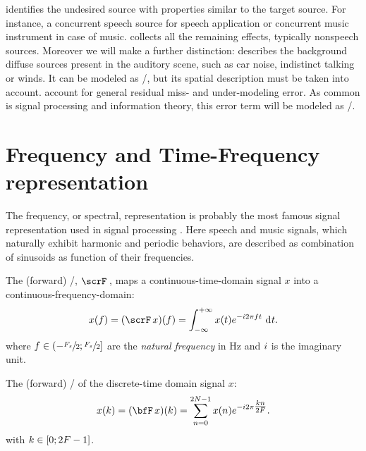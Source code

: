  identifies the undesired source with properties similar to the target source.
For instance, a concurrent speech source for speech application or concurrent music instrument in case of music.
 collects all the remaining effects, typically nonspeech sources. Moreover we will make a further distinction:
 describes the background diffuse sources present in the auditory scene, such as car noise, indistinct talking or winds.
It can be modeled as \AWGNdef/, but its spatial description must be taken into account.
 account for general residual miss- and under-modeling error.
As common is signal processing and information theory, this error term will be modeled as \AWGN/.

\section{Frequency and Time-Frequency representation}\label{sec:processing:domains}
The frequency, or spectral, representation is probably the most famous signal representation used in signal processing
.
Here speech and music signals, which naturally exhibit harmonic and periodic behaviors,
are described as combination of sinusoids as function of their frequencies.

The (forward) \FTdef/, $\fourierTrans{}$, maps a continuous-time-domain signal $x$ into a continuous-frequency-domain:
\begin{equation}
    x(f) = (\fourierTrans{x})(f) =
        \int_{-\infty}^{+\infty}
        x(t)
        \cste^{-\csti 2 \pi f t}
        \,\kdiff{t}.
\end{equation}
where $f \in \kintervoc{-\sfrac{\Fs}{2}}{\sfrac{\Fs}{2}}$ are the \textit{natural frequency} in $\si{\Hz}$ and ${i}$ is the imaginary unit.

The (forward) \DFTdef/ of the discrete-time domain signal $x$:
\begin{equation}\label{eq:processing:dft}
    x(k) = (\discreteFT{x})(k) =
    \sum_{n = 0}^{2 N - 1}
    x(n)
    \cste^{-\csti2\pi \tfrac{k n}{2 F}}.
\end{equation}
with $k \in \kintervcc{0}{2 F - 1}$.

